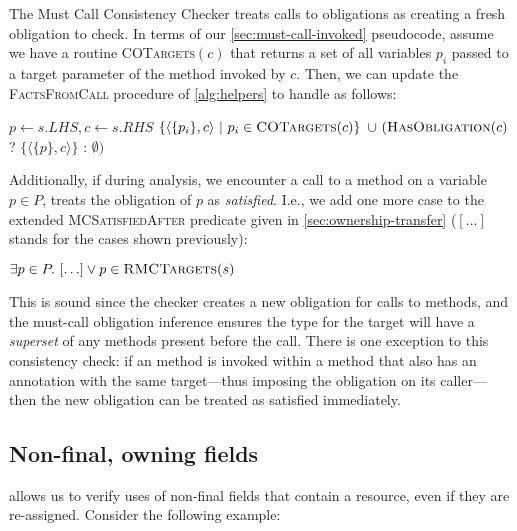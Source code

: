 The Must Call Consistency Checker treats calls to \ResetMustCall obligations
as creating a fresh obligation to check.  In terms of our \cref{sec:must-call-invoked} pseudocode,
assume we have a routine \textsc{COTargets}$(c)$ that returns a set of all
variables $p_i$ passed to a \ResetMustCall target parameter of the method
invoked by $c$.  Then, we can update the \textsc{FactsFromCall} procedure of
\cref{alg:helpers} to handle \ResetMustCall as follows:
\begin{algorithmic}
  \State $p \gets s.LHS, c \gets s.RHS$
  \State \Return $\{ \langle \{ p_i \}, c \rangle\ |\ p_i \in \textsc{COTargets}(c) \}$ \newline
  \hspace*{5em} $\cup\ (\textsc{HasObligation}(c)$ ? $\{ \langle \{ p \}, c \rangle \}$ : $\emptyset)$
  \EndProcedure
  \end{algorithmic}
Additionally, if during analysis, we encounter a call to a \ResetMustCall
method on a variable $p \in P$, \Tool treats the \MustCall
obligation of $p$ as \emph{satisfied}.  I.e., we add one more
case to the extended \textsc{MCSatisfiedAfter} predicate given in
\cref{sec:ownership-transfer} ($[\ldots]$ stands for the cases shown previously):
\begin{algorithmic}
  \State \Return $\exists p \in P .\ [\ldots] \vee p \in \textsc{RMCTargets}(s)$
  \EndProcedure
\end{algorithmic}
\noindent
This is sound since the checker creates a new obligation for calls to
\ResetMustCall methods, and the must-call obligation inference ensures the
\MustCall type for the target will have a \emph{superset} of any methods present
before the call.
There is one exception to this consistency check: if an \ResetMustCall
method is invoked within a method that also has an \ResetMustCall annotation
with the same target---thus imposing the obligation on its caller---then
the new obligation can be treated as satisfied immediately.

\subsection{Non-final, owning fields}
\label{sec:non-final-owning}

\ResetMustCall allows us to verify uses of non-final fields
that contain a resource, even if they are re-assigned. Consider
the following example:

